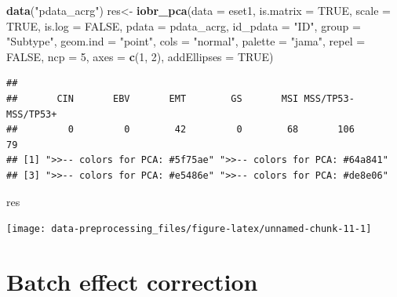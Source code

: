 \documentclass[
  12pt,
]{book}
\newenvironment{Shaded}{\begin{snugshade}}{\end{snugshade}}
\newcommand{\AttributeTok}[1]{\textcolor[rgb]{0.13,0.29,0.53}{#1}}
\newcommand{\ConstantTok}[1]{\textcolor[rgb]{0.56,0.35,0.01}{#1}}
\newcommand{\DecValTok}[1]{\textcolor[rgb]{0.00,0.00,0.81}{#1}}
\newcommand{\FunctionTok}[1]{\textcolor[rgb]{0.13,0.29,0.53}{\textbf{#1}}}
\newcommand{\NormalTok}[1]{#1}
\newcommand{\OtherTok}[1]{\textcolor[rgb]{0.56,0.35,0.01}{#1}}
\newcommand{\StringTok}[1]{\textcolor[rgb]{0.31,0.60,0.02}{#1}}
\begin{document}
\begin{Shaded}
\begin{Highlighting}[]
\FunctionTok{data}\NormalTok{(}\StringTok{"pdata\_acrg"}\NormalTok{)}
\NormalTok{res}\OtherTok{\textless{}{-}} \FunctionTok{iobr\_pca}\NormalTok{(}\AttributeTok{data       =}\NormalTok{ eset1,}
              \AttributeTok{is.matrix   =} \ConstantTok{TRUE}\NormalTok{,}
              \AttributeTok{scale       =} \ConstantTok{TRUE}\NormalTok{,}
              \AttributeTok{is.log      =} \ConstantTok{FALSE}\NormalTok{,}
              \AttributeTok{pdata       =}\NormalTok{ pdata\_acrg, }
              \AttributeTok{id\_pdata    =} \StringTok{"ID"}\NormalTok{, }
              \AttributeTok{group       =} \StringTok{"Subtype"}\NormalTok{,}
              \AttributeTok{geom.ind    =} \StringTok{"point"}\NormalTok{, }
              \AttributeTok{cols        =} \StringTok{"normal"}\NormalTok{,}
              \AttributeTok{palette     =} \StringTok{"jama"}\NormalTok{, }
              \AttributeTok{repel       =} \ConstantTok{FALSE}\NormalTok{,}
              \AttributeTok{ncp         =} \DecValTok{5}\NormalTok{,}
              \AttributeTok{axes        =} \FunctionTok{c}\NormalTok{(}\DecValTok{1}\NormalTok{, }\DecValTok{2}\NormalTok{),}
              \AttributeTok{addEllipses =} \ConstantTok{TRUE}\NormalTok{)}
\end{Highlighting}
\end{Shaded}

\begin{verbatim}
## 
##       CIN       EBV       EMT        GS       MSI MSS/TP53- MSS/TP53+ 
##         0         0        42         0        68       106        79 
## [1] ">>-- colors for PCA: #5f75ae" ">>-- colors for PCA: #64a841"
## [3] ">>-- colors for PCA: #e5486e" ">>-- colors for PCA: #de8e06"
\end{verbatim}

\begin{Shaded}
\begin{Highlighting}[]
\NormalTok{res}
\end{Highlighting}
\end{Shaded}

\begin{center}\texttt{[image: data-preprocessing\_files/figure-latex/unnamed-chunk-11-1]} \end{center}

\hypertarget{batch-effect-correction}{%
\section{Batch effect correction}\label{batch-effect-correction}}
\end{document}
